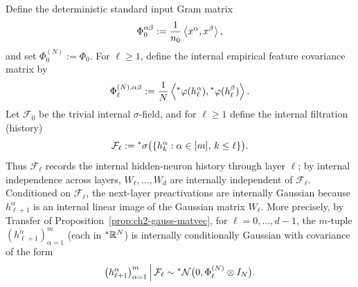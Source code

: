 Define the deterministic standard input Gram matrix
\begin{equation}\label{eq:ch2-phi0}
\Phi_0^{\alpha\beta} := \frac{1}{n_0} \left\langle x^\alpha, x^\beta \right\rangle,
\end{equation}
and set $\Phi_0^{(N)} := \Phi_0$. For $\ell \ge 1$, define the internal empirical feature covariance matrix by
\begin{equation}\label{eq:ch2-phi-ell-emp}
\Phi_\ell^{(N),\alpha\beta} := \frac{1}{N} \left\langle {}^*\varphi(h_\ell^\alpha), {}^*\varphi(h_\ell^\beta) \right\rangle.
\end{equation}
Let $\mathcal{F}_0$ be the trivial internal $\sigma$-field, and for $\ell \ge 1$ define the internal filtration (history)
\begin{equation}\label{eq:ch2-filtration}
\mathcal{F}_\ell := {}^*\sigma\bigl(\{h_k^\alpha : \alpha \in [m],\, k \le \ell\}\bigr).
\end{equation}
Thus $\mathcal{F}_\ell$ records the internal hidden-neuron history through layer $\ell$; by internal independence across layers, $W_\ell, \dots, W_d$ are internally independent of $\mathcal{F}_\ell$. Conditioned on $\mathcal{F}_\ell$, the next-layer preactivations are internally Gaussian because $h_{\ell+1}^\alpha$ is an internal linear image of the Gaussian matrix $W_\ell$. More precisely, by Transfer of Proposition~\ref{prop:ch2-gauss-matvec}, for $\ell = 0, \dots, d-1$, the $m$-tuple $(h_{\ell+1}^\alpha)_{\alpha=1}^{m}$ (each in ${}^*\mathbb{R}^N$) is internally conditionally Gaussian with covariance of the form
\begin{equation}\label{eq:ch2-hell-cond-law}
\bigl(h_{\ell+1}^\alpha\bigr)_{\alpha=1}^{m} \,\Big|\, \mathcal{F}_\ell \sim {}^*\mathcal{N}\bigl(0, \Phi_\ell^{(N)} \otimes I_N\bigr).
\end{equation}

